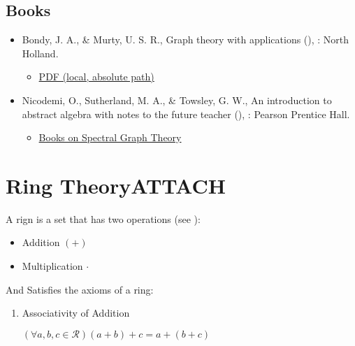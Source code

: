 \documentclass[a4paper,11pt,twoside]{article}
\begin{document}
\subsection{Books}
\label{sec:orgd881d80}
\begin{itemize}
\item Bondy, J. A., \& Murty, U. S. R., Graph theory with applications (), : North Holland. \cite{bondyGraphTheoryApplications1976}
\begin{itemize}
\item \href{file:///home/ryan/Sync/Books/Textbooks/Mathematics/Data Science/GraphTheory/Graph\_Theory\_Bondy\_Murty.pdf}{PDF (local, absolute path)}
\end{itemize}
\item Nicodemi, O., Sutherland, M. A., \& Towsley, G. W., An introduction to abstract algebra with notes to the future teacher (), : Pearson Prentice Hall. \cite{nicodemiIntroductionAbstractAlgebra2007a}
\begin{itemize}
\item \href{file:///home/ryan/Sync/Books/Textbooks/Mathematics/Data Science/GraphTheory/Spectral\_Graph\_Theory}{Books on Spectral Graph Theory}
\end{itemize}
\end{itemize}





\section{Ring Theory\hfill{}\textsc{ATTACH}}
\label{sec:org6b9f292}
A rign is a set that has two operations (see \cite[\S\S 2.4-2.6]{nicodemiIntroductionAbstractAlgebra2007a}):

\begin{itemize}
\item Addition \((+)\)
\item Multiplication \(\cdot\)
\end{itemize}

And Satisfies the axioms of a ring:

\begin{enumerate}
\item Associativity of Addition

\(\left( \forall a,b,c \in \mathcal{R} \right) \left( a+ b \right) +  c = a +  \left(  b +  c    \right)\)
\end{enumerate}
\end{document}
